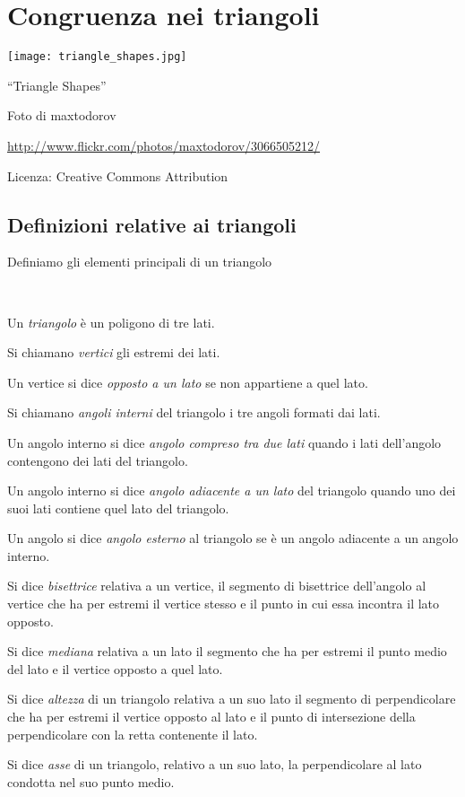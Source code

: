 \chapter{Congruenza nei triangoli}

\texttt{[image: triangle\_shapes.jpg]}
  \begin{center}
    {\large ``Triangle Shapes''}\par
    Foto di maxtodorov\par
    \url{http://www.flickr.com/photos/maxtodorov/3066505212/}\par
    Licenza: Creative Commons Attribution\par
  \end{center}
\newpage

\section{Definizioni relative ai triangoli}

Definiamo gli elementi principali di un triangolo
\begin{definizione}~
\begin{itemize*}
\item Un \emph{triangolo} è un poligono di tre lati.
\item Si chiamano \emph{vertici} gli estremi dei lati.
\item Un vertice si dice \emph{opposto a un lato} se non appartiene a quel lato.
\item Si chiamano \emph{angoli interni} del triangolo i tre angoli formati dai lati.
\item Un angolo interno si dice \emph{angolo compreso tra due lati} quando i lati dell'angolo contengono dei lati del triangolo.
\item Un angolo interno si dice \emph{angolo adiacente a un lato} del triangolo quando uno dei suoi lati contiene quel lato del triangolo.
\item Un angolo si dice \emph{angolo esterno} al triangolo se è un angolo adiacente a un angolo interno.
\item Si dice \emph{bisettrice} relativa a un vertice, il segmento di bisettrice dell'angolo al vertice che ha per estremi il vertice stesso e il punto in cui essa incontra il lato opposto.
\item Si dice \emph{mediana} relativa a un lato il segmento che ha per estremi il punto medio del lato e il vertice opposto a quel lato.
\item Si dice \emph{altezza} di un triangolo relativa a un suo lato il segmento di perpendicolare che ha per estremi il vertice opposto al lato e il punto di intersezione della perpendicolare con la retta contenente il lato. 
\item Si dice \emph{asse} di un triangolo, relativo a un suo lato, la perpendicolare al lato condotta nel suo punto medio.
\end{itemize*}
\end{definizione}

